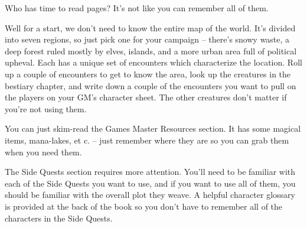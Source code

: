 \begin{multicols}{2}

Who has time to read \pageref{lastpage} pages?  It's not like you can remember all of them.

Well for a start, we don't need to know the entire map of the world.
It's divided into seven regions, so just pick one for your campaign -- there's snowy waste, a deep forest ruled mostly by elves, islands, and a more urban area full of political upheval.
Each has a unique set of encounters which characterize the location.
Roll up a couple of encounters to get to know the area, look up the creatures in the bestiary chapter, and write down a couple of the encounters you want to pull on the players on your GM's character sheet.
The other creatures don't matter if you're not using them.

You can just skim-read the Games Master Resources section.
It has some magical items, mana-lakes, et c. -- just remember where they are so you can grab them when you need them.

The Side Quests section requires more attention.
You'll need to be familiar with each of the Side Quests you want to use, and if you want to use all of them, you should be familiar with the overall plot they weave.
A helpful character glossary is provided at the back of the book so you don't have to remember all of the characters in the Side Quests.

\end{multicols}

